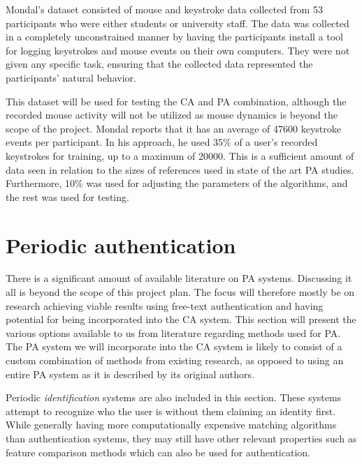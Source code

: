 Mondal's dataset consisted of mouse and keystroke data collected from 53 participants who were either students or university staff.
The data was collected in a completely unconstrained manner by having the participants install a tool for logging keystrokes and mouse events on their own computers.
They were not given any specific task, ensuring that the collected data represented the participants' natural behavior.

This dataset will be used for testing the CA and PA combination, although the recorded mouse activity will not be utilized as mouse dynamics is beyond the scope of the project.
Mondal reports that it has an average of 47600 keystroke events per participant. 
In his approach, he used 35\% of a user's recorded keystrokes for training, up to a maximum of 20000.
This is a sufficient amount of data seen in relation to the sizes of references used in state of the art PA studies.
Furthermore, 10\% was used for adjusting the parameters of the algorithms, and the rest was used for testing.


\section{Periodic authentication}
\label{sec:related-other}
There is a significant amount of available literature on PA systems.
Discussing it all is beyond the scope of this project plan. The focus will therefore mostly be on research achieving viable results using free-text authentication and having potential for being incorporated into the CA system.
This section will present the various options available to us from literature regarding methods used for PA.
The PA system we will incorporate into the CA system is likely to consist of a custom combination of methods from existing research, as opposed to using an entire PA system as it is described by its original authors.

Periodic \textit{identification} systems are also included in this section.
These systems attempt to recognize who the user is without them claiming an identity first.
While generally having more computationally expensive matching algorithms than authentication systems, they may still have other relevant properties such as feature comparison methods which can also be used for authentication.

